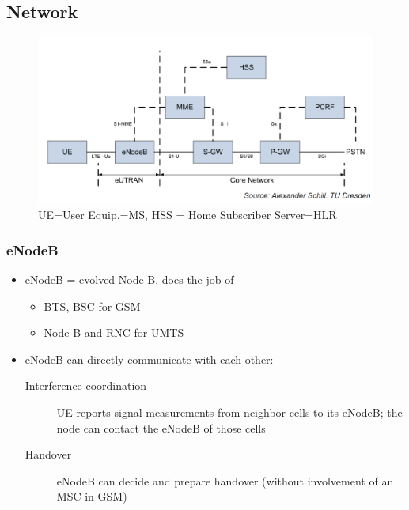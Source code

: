 \subsection{Network}
\begin{figure}[ht!]
	\centering
	\includegraphics[scale=0.5]{img/lte.png}
	\caption{UE=User Equip.=MS, HSS = Home Subscriber Server=HLR}
\end{figure}

\subsubsection{eNodeB}
\begin{itemize}
    \item eNodeB = evolved Node B, does the job of 
        \begin{itemize}
            \item BTS, BSC for GSM
            \item Node B and RNC for UMTS
        \end{itemize}
    \item eNodeB can directly communicate with each other:
        \begin{description}
            \item[Interference coordination] UE reports signal measurements from neighbor 
                cells to its eNodeB; the node can contact the eNodeB of those cells
            \item[Handover] eNodeB can decide and prepare handover 
                (without involvement of an MSC in GSM)
        \end{description}
\end{itemize}

